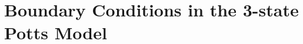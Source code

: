 \chapter{\label{ch:5-Loop equations for Boundary Conditions in the 3-state Potts Model} Boundary Conditions in the 3-state Potts Model}




